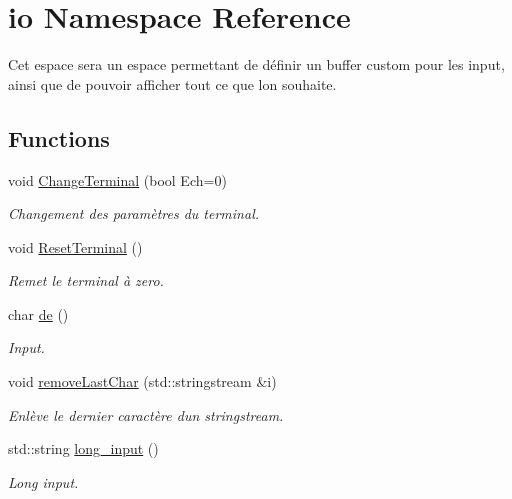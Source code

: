\hypertarget{namespaceio}{}\section{io Namespace Reference}
\label{namespaceio}


Cet espace sera un espace permettant de définir un buffer custom pour les input, ainsi que de pouvoir afficher tout ce que l\textquotesingle{}on souhaite.  


\subsection*{Functions}
\begin{DoxyCompactItemize}
\item 
void \hyperlink{namespaceio_ac0223d0ecfee82d8cc86543604173b73}{Change\+Terminal} (bool Ech=0)
\begin{DoxyCompactList}\small\item\em Changement des paramètres du terminal. \end{DoxyCompactList}\item 
\mbox{\label{namespaceio_a44a79937063c75bdcd8f042d5f55d501}} 
void \hyperlink{namespaceio_a44a79937063c75bdcd8f042d5f55d501}{Reset\+Terminal} ()
\begin{DoxyCompactList}\small\item\em Remet le terminal à zero. \end{DoxyCompactList}\item 
char \hyperlink{namespaceio_ae9908b55f26f07e78043d7cfad003d22}{de} ()
\begin{DoxyCompactList}\small\item\em Input. \end{DoxyCompactList}\item 
\mbox{\label{namespaceio_a0ed486192687092d372440a79c3a65a3}} 
void \hyperlink{namespaceio_a0ed486192687092d372440a79c3a65a3}{remove\+Last\+Char} (std\+::stringstream \&i)
\begin{DoxyCompactList}\small\item\em Enlève le dernier caractère d\textquotesingle{}un stringstream. \end{DoxyCompactList}\item 
std\+::string \hyperlink{namespaceio_ab044be3afd7ac04eeb1a496af0f1d5c6}{long\+\_\+input} ()
\begin{DoxyCompactList}\small\item\em Long input. \end{DoxyCompactList}\item 

\end{DoxyCompactItemize}
